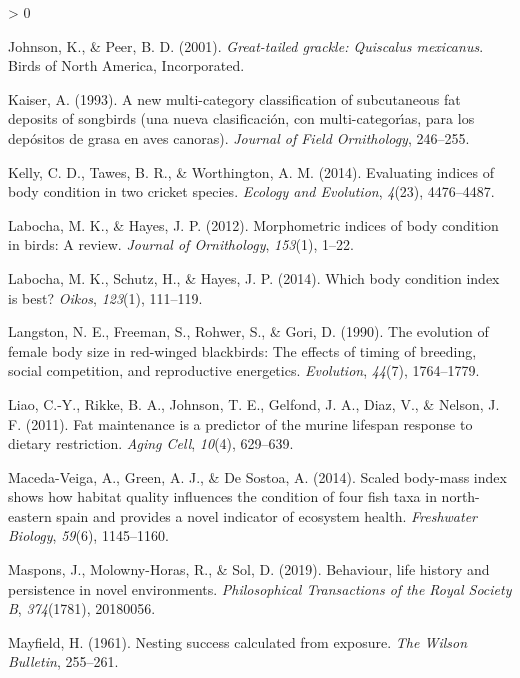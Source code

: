 \documentclass[
]{article}
\newlength{\cslhangindent}
\newenvironment{CSLReferences}[2] %
 {%
  \setlength{\parindent}{0pt}
  \ifodd #1 \everypar{\setlength{\hangindent}{\cslhangindent}}\ignorespaces\fi
  \ifnum #2 > 0
  \setlength{\parskip}{#2\baselineskip}
  \fi
 }%
 {}
\begin{document}
\begin{CSLReferences}{1}{0}
\leavevmode\hypertarget{ref-johnson2001great}{}%
Johnson, K., \& Peer, B. D. (2001). \emph{Great-tailed grackle:
Quiscalus mexicanus}. Birds of North America, Incorporated.

\leavevmode\hypertarget{ref-kaiser1993new}{}%
Kaiser, A. (1993). A new multi-category classification of subcutaneous
fat deposits of songbirds (una nueva clasificaci{ó}n, con
multi-categor{ı́}as, para los dep{ó}sitos de grasa en aves canoras).
\emph{Journal of Field Ornithology}, 246--255.

\leavevmode\hypertarget{ref-kelly2014evaluating}{}%
Kelly, C. D., Tawes, B. R., \& Worthington, A. M. (2014). Evaluating
indices of body condition in two cricket species. \emph{Ecology and
Evolution}, \emph{4}(23), 4476--4487.

\leavevmode\hypertarget{ref-labocha2012morphometric}{}%
Labocha, M. K., \& Hayes, J. P. (2012). Morphometric indices of body
condition in birds: A review. \emph{Journal of Ornithology},
\emph{153}(1), 1--22.

\leavevmode\hypertarget{ref-labocha2014body}{}%
Labocha, M. K., Schutz, H., \& Hayes, J. P. (2014). Which body condition
index is best? \emph{Oikos}, \emph{123}(1), 111--119.

\leavevmode\hypertarget{ref-langston1990evolution}{}%
Langston, N. E., Freeman, S., Rohwer, S., \& Gori, D. (1990). The
evolution of female body size in red-winged blackbirds: The effects of
timing of breeding, social competition, and reproductive energetics.
\emph{Evolution}, \emph{44}(7), 1764--1779.

\leavevmode\hypertarget{ref-liao2011fat}{}%
Liao, C.-Y., Rikke, B. A., Johnson, T. E., Gelfond, J. A., Diaz, V., \&
Nelson, J. F. (2011). Fat maintenance is a predictor of the murine
lifespan response to dietary restriction. \emph{Aging Cell},
\emph{10}(4), 629--639.

\leavevmode\hypertarget{ref-maceda2014scaled}{}%
Maceda-Veiga, A., Green, A. J., \& De Sostoa, A. (2014). Scaled
body-mass index shows how habitat quality influences the condition of
four fish taxa in north-eastern spain and provides a novel indicator of
ecosystem health. \emph{Freshwater Biology}, \emph{59}(6), 1145--1160.

\leavevmode\hypertarget{ref-maspons2019behaviour}{}%
Maspons, J., Molowny-Horas, R., \& Sol, D. (2019). Behaviour, life
history and persistence in novel environments. \emph{Philosophical
Transactions of the Royal Society B}, \emph{374}(1781), 20180056.

\leavevmode\hypertarget{ref-mayfield1961nesting}{}%
Mayfield, H. (1961). Nesting success calculated from exposure. \emph{The
Wilson Bulletin}, 255--261.


\end{CSLReferences}
\end{document}
